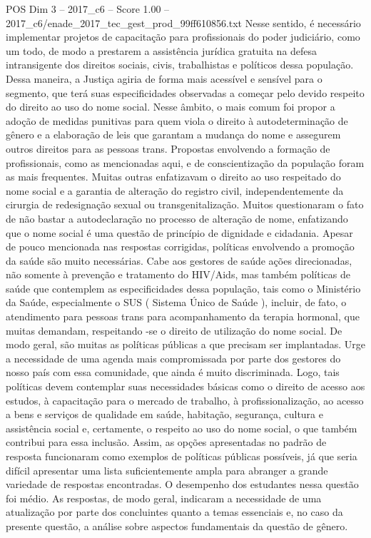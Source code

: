 \begin{textsample}{POS Dim 3 – 2017\_c6 – Score 1.00 – 2017\_c6/enade\_2017\_tec\_gest\_prod\_99ff610856.txt}
Nesse sentido, é necessário implementar projetos de capacitação para profissionais do poder judiciário, como um todo, de modo a prestarem a assistência jurídica gratuita na defesa intransigente dos direitos sociais, civis, trabalhistas e políticos dessa população.
Dessa maneira, a Justiça agiria de forma mais acessível e sensível para o segmento, que terá suas especificidades observadas a começar pelo devido respeito do direito ao uso do nome social.
Nesse âmbito, o mais comum foi propor a adoção de medidas punitivas para quem viola o direito à autodeterminação de gênero e a elaboração de leis que garantam a mudança do nome e assegurem outros direitos para as pessoas trans.
Propostas envolvendo a formação de profissionais, como as mencionadas aqui, e de conscientização da população foram as mais frequentes.
Muitas outras enfatizavam o direito ao uso respeitado do nome social e a garantia de alteração do registro civil, independentemente da cirurgia de redesignação sexual ou transgenitalização.
Muitos questionaram o fato de não bastar a autodeclaração no processo de alteração de nome, enfatizando que o nome social é uma questão de princípio de dignidade e cidadania.
Apesar de pouco mencionada nas respostas corrigidas, políticas envolvendo a promoção da saúde são muito necessárias.
Cabe aos gestores de saúde ações direcionadas, não somente à prevenção e tratamento do HIV/Aids, mas também políticas de saúde que contemplem as especificidades dessa população, tais como o Ministério da Saúde, especialmente o SUS ( Sistema Único de Saúde ), incluir, de fato, o atendimento para pessoas trans para acompanhamento da terapia hormonal, que muitas demandam, respeitando -se o direito de utilização do nome social.
De modo geral, são muitas as políticas públicas a que precisam ser implantadas.
Urge a necessidade de uma agenda mais compromissada por parte dos gestores do nosso país com essa comunidade, que ainda é muito discriminada.
Logo, tais políticas devem contemplar suas necessidades básicas como o direito de acesso aos estudos, à capacitação para o mercado de trabalho, à profissionalização, ao acesso a bens e serviços de qualidade em saúde, habitação, segurança, cultura e assistência social e, certamente, o respeito ao uso do nome social, o que também contribui para essa inclusão.
Assim, as opções apresentadas no padrão de resposta funcionaram como exemplos de políticas públicas possíveis, já que seria difícil apresentar uma lista suficientemente ampla para abranger a grande variedade de respostas encontradas.
O desempenho dos estudantes nessa questão foi médio.
As respostas, de modo geral, indicaram a necessidade de uma atualização por parte dos concluintes quanto a temas essenciais e, no caso da presente questão, a análise sobre aspectos fundamentais da questão de gênero.

\end{textsample}
